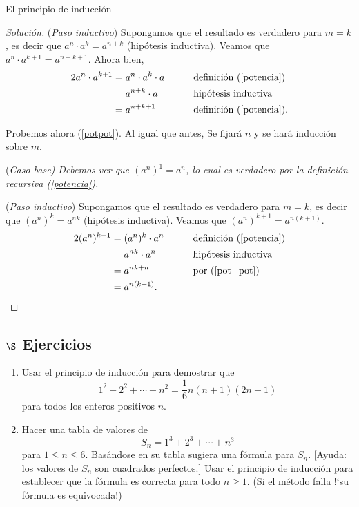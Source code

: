 \begin{section}{El principio de inducción}
\begin{ejemplo}
\begin{proof}[Solución]
\noindent ({\it Paso  inductivo}) Supongamos que el resultado es verdadero para $m=k$, es decir que $a^{n} \cdot a^k = a^{n+k}$ (hipótesis inductiva). Veamos que  $a^{n} \cdot a^{k+1} = a^{n+k+1}$. Ahora bien, 
\begin{alignat*}2
a^{n} \cdot a^{k+1} &= a^{n} \cdot a^{k} \cdot a &\qquad  &\text{definición (\ref{potencia})} \\
&= a^{n+k} \cdot a &\qquad &\text{hipótesis inductiva} \\
&= a^{n+k+1} &\qquad  &\text{definición (\ref{potencia})}. 
\end{alignat*}

Probemos ahora (\ref{potpot}). Al igual que antes, Se fijará $n$ y se hará inducción sobre $m$.

\noindent(\it Caso  base\rm) Debemos ver que $(a^n)^1 = a^n$, lo cual es verdadero por la definición recursiva (\ref{potencia}). 


\noindent ({\it Paso  inductivo}) Supongamos que el resultado es verdadero para $m=k$, es decir que  $(a^n)^k = a^{nk}$ (hipótesis inductiva). Veamos que  $(a^n)^{k+1} = a^{n(k+1)}$. 
\begin{alignat*}2
(a^n)^{k+1} &= (a^n)^{k} \cdot a^n &\qquad  &\text{definición (\ref{potencia})} \\
&= a^{nk} \cdot a^n &\qquad &\text{hipótesis inductiva} \\
&= a^{nk+n} &\qquad  &\text{por (\ref{pot+pot}})\\
&= a^{n(k+1)}. &\qquad  &
\end{alignat*}

\end{proof}
\end{ejemplo}



\subsection*{\Large $\S$ Ejercicios}
\begin{enumerate}[1)]
\item Usar el principio de inducción para demostrar que
$$
1^2+2^2+\cdots +n^2 = \frac16 n(n+1)(2n +1)
$$
para todos los enteros positivos $n$.

\item Hacer una tabla de valores de
$$
S_n = 1^3+2^3+\cdots +n^3
$$
para $1 \le n\le 6$. Basándose en su tabla sugiera una fórmula
para $S_n$. [Ayuda: los valores de $S_n$ son cuadrados perfectos.]
Usar el principio de inducción para establecer que la fórmula es
correcta para todo $n\ge 1$. (Si el método falla !`su fórmula es
equivocada!)


\end{enumerate}
\end{section}
